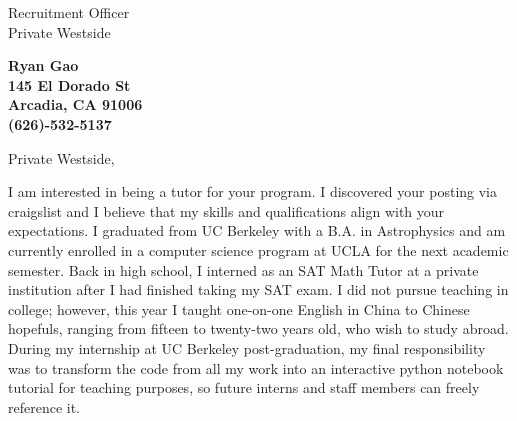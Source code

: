 \documentclass[11pt]{letter} %
\begin{document}

\begin{letter}{Recruitment Officer \\
  Private Westside} 


\begin{center}
\large\bf Ryan Gao \\
145 El Dorado St \\ Arcadia, CA 91006 \\ (626)-532-5137 %
\end{center} 
\vfill

\signature{Ryan Gao} %


\opening{Private Westside,} 
 
I am interested in being a tutor for your program. I discovered your posting via craigslist and I believe that my skills and qualifications align with your expectations. I graduated from UC Berkeley with a B.A. in Astrophysics and am currently enrolled in a computer science program at UCLA for the next academic semester. Back in high school, I interned as an SAT Math Tutor at a private institution after I had finished taking my SAT exam. I did not pursue teaching in college; however, this year I taught one-on-one English in China to Chinese hopefuls, ranging from fifteen to twenty-two years old, who wish to study abroad. During my internship at UC Berkeley post-graduation, my final responsibility was to transform the code from all my work into an interactive python notebook tutorial for teaching purposes, so future interns and staff members can freely reference it.


\end{letter}
\end{document}
